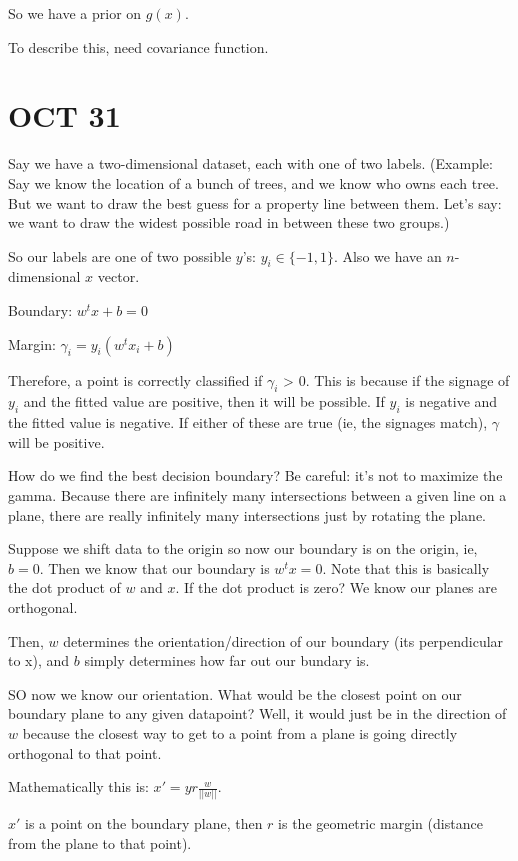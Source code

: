 \documentclass[12pt]{article}
\begin{document}
So we have a prior on $g(x)$.

To describe this, need covariance function.

\section{OCT 31}

Say we have a two-dimensional dataset, each with one of two labels. (Example: Say we know the location of a bunch of trees, and we know who owns each tree. But we want to draw the best guess for a property line between them. Let's say: we want to draw the widest possible road in between these two groups.)

So our labels are one of two possible $y$'s: $y_i \in \{-1, 1\}$. Also we have an $n$-dimensional $x$ vector.

Boundary: $w^tx + b = 0$

Margin: $\gamma_i = y_i(w^tx_i + b)$

Therefore, a point is correctly classified if $\gamma_i$ > 0. This is because if the signage of $y_i$ and the fitted value are positive, then it will be possible. If $y_i$ is negative and the fitted value is negative. If either of these are true (ie, the signages match), $\gamma$ will be positive.

How do we find the best decision boundary? Be careful: it's not to maximize the gamma. Because there are infinitely many intersections between a given line on a plane, there are really infinitely many intersections just by rotating the plane.

Suppose we shift data to the origin so now our boundary is on the origin, ie, $b=0$. Then we know that our boundary is $w^tx = 0$. Note that this is basically the dot product of $w$ and $x$. If the dot product is zero? We know our planes are orthogonal.

Then, $w$ determines the orientation/direction of our boundary (its perpendicular to x), and $b$ simply determines how far out our bundary is.

SO now we know our orientation. What would be the closest point on our boundary plane to any given datapoint? Well, it would just be in the direction of $w$ because the closest way to get to a point from a plane is going directly orthogonal to that point.

Mathematically this is: $x' = yr\frac{w}{||w||}$.

$x'$ is a point on the boundary plane, then $r$ is the geometric margin (distance from the plane to that point).
\end{document}
